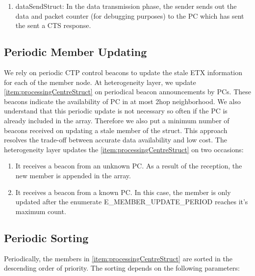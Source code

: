 \begin{enumerate}
\begin{enumerate}
                    \item dataSendStruct: In the data transmission phase, the sender sends out the data and packet counter (for debugging purposes) to the \ac{PC} which has sent the sent a \ac{CTS} response.
                    
                \end{enumerate}
                
        \end{enumerate}
    
    \subsection{Periodic Member Updating}
    
    We rely on periodic \ac{CTP} control beacons to update the stale ETX information for each of the member node. At heterogeneity layer, we update \ref{item:processingCentreStruct} on periodical beacon announcements by \acp{PC}. These beacons indicate the availability of \ac{PC} in at most 2hop neighborhood. We also understand that this periodic update is not necessary so often if the \ac{PC} is already included in the array. Therefore we also put a minimum number of beacons received on updating a stale member of the struct. This approach resolves the trade-off between accurate data availability and low cost. The heterogeneity layer updates the \ref{item:processingCentreStruct} on two occasions:
    
    \begin{enumerate}
        \item It receives a beacon from an unknown \ac{PC}. As a result of the reception, the new member is appended in the array.
        
        \item It receives a beacon from a known \ac{PC}. In this case, the member is only updated after the enumerate E\_MEMBER\_UPDATE\_PERIOD reaches it's maximum count.
    \end{enumerate}
    
    \subsection{Periodic Sorting}
    
    Periodically, the members in \ref{item:processingCentreStruct} are sorted in the descending order of priority. The sorting depends on the following parameters:
    
